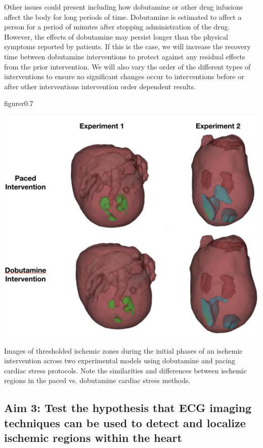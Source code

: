 Other issues could present including how dobutamine or other drug infusions affect the body for long periods of time. Dobutamine is estimated to affect a person for a period of minutes after stopping administration of the drug. However, the effects of dobutamine may persist longer than the physical symptoms reported by patients. If this is the case, we will increase the recovery time between dobutamine interventions to protect against any residual effects from the prior intervention. We will also vary the order of the different types of interventions to ensure no significant changes occur to interventions before or after other interventions \ie{} intervention order dependent results. 
\begin{wrapfloat}{figure}{r}{0.7\textwidth}
	\begin{center}
		{\includegraphics[width=.7\textwidth]
			{../Figures/DobutvsPacing.png}}
		\captionsetup{width = .7\textwidth}
		\caption{\small \label{fig:dobutPacingThreshold} Images of thresholded ischemic zones during the initial phases of an ischemic intervention across two experimental models using dobutamine and pacing cardiac stress protocols. Note the similarities and differences between ischemic regions in the paced vs. dobutamine cardiac stress methods. }
	\end{center}
\end{wrapfloat}

\subsection{Aim 3: Test the hypothesis that ECG imaging techniques can be used to detect and localize ischemic regions within the heart}

